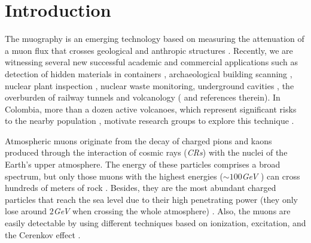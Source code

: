 \documentclass[submitting]{nst}
\begin{document}

\maketitle
\section{Introduction}\label{sec:introduction}
The muography is an emerging technology based on measuring the attenuation of a muon flux that crosses geological and anthropic structures \cite{Kaiser2019}. Recently, we are witnessing several new successful academic and commercial applications such as detection of hidden materials in containers \cite{BlanpiedEtal2015}, archaeological building scanning \cite{MorishimaEtal2017, GomezEtal2016}, nuclear plant inspection \cite{FujiiEtal2013}, nuclear waste monitoring, underground cavities \cite{SaracinoEtal2017}, the overburden of railway tunnels \cite{ThompsonEtal2019} and volcanology (\cite{TanakaOlah2019} and references therein). In Colombia, more than a dozen active volcanoes, which represent significant risks to the nearby population \cite{Cortes2016, Agudelo2016, Munoz2017}, motivate research groups to explore this technique \cite{AsoreyEtal2017B, SierraPortaEtal2018, PenaRodriguezEtal2018, GuerreroEtal2019, ParraAvila2019, PenarodriguezEtal2019}.  

Atmospheric muons originate from the decay of charged pions and kaons produced through the interaction of cosmic rays (\textsl{CRs}) with the nuclei of the Earth's upper atmosphere. The energy of these particles comprises a broad spectrum, but only those muons with the highest energies ($\sim 100$\textsl{GeV}  ) can cross hundreds of meters of rock \cite{MarteauEtal2012}. Besides, they are the most abundant charged particles that reach the sea level due to their high penetrating power (they only lose around $2$\textsl{GeV}   when crossing the whole atmosphere) \cite{MarteauEtal2012}. Also, the muons are easily detectable by using different techniques based on ionization, excitation, and the Cerenkov effect \cite{MarteauEtal2012}. 
\end{document}
